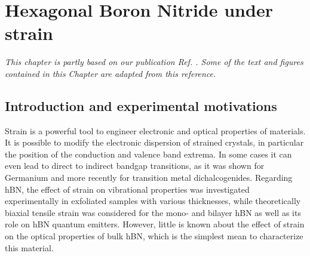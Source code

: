 \chapter{Hexagonal Boron Nitride under strain} \label{chap:strain}
\textit{This chapter is partly based on our publication Ref. \cite{lechifflart2022excitons}. Some of the text and figures contained in this Chapter are adapted from this reference.}

\chaptertoc{}

%
\section{Introduction and experimental motivations}
Strain is a powerful tool to engineer electronic and optical properties of materials. It is possible to modify the electronic dispersion of strained crystals, in particular the position of the conduction and valence band extrema. In some cases it can even lead to direct to indirect bandgap transitions, as it was shown for Germanium \cite{hoshina2009first,cheng2010strain} and more recently for transition metal dichalcogenides.\cite{desai2014strain,choudhary2020shear,frisenda2017biaxial} Regarding \acrshort{hBN}, the effect of strain on vibrational properties was investigated experimentally in exfoliated samples with various thicknesses,\cite{androulidakis2018strained} while theoretically biaxial tensile strain was considered for the mono- and bilayer \acrshort{hBN} \cite{yang2013distorted,fujimoto2016band} as well as its role on hBN quantum emitters.\cite{tabesh2021strain} However, little is known about the effect of strain on the optical properties of bulk \acrshort{hBN}, which is the simplest mean to characterize this material. 

